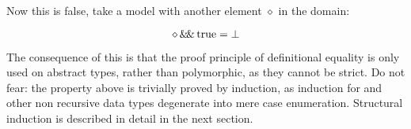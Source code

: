 Now this is false, take a model with another element $\diamond$ in the
domain:

$$\diamond \, \mathrm{\&\!\&} \, \mathrm{true} = \bot$$

The consequence of this is that the proof principle of definitional
equality is only used on abstract types, rather than polymorphic, as
they cannot be strict. Do not fear: the property above is trivially
proved by induction, as induction for  and other non
recursive data types degenerate into mere case enumeration. Structural
induction is described in detail in the next section.


